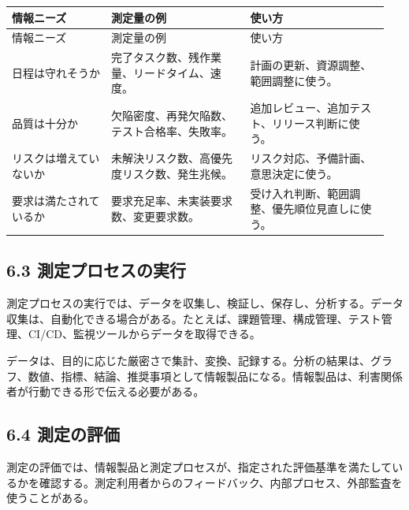 \documentclass[a4paper,11pt]{ltjsarticle}
\begin{document}
\begin{longtable}{>{\raggedright\arraybackslash}p{0.25\linewidth}>{\raggedright\arraybackslash}p{0.35\linewidth}>{\raggedright\arraybackslash}p{0.35\linewidth}}
\toprule
情報ニーズ & 測定量の例 & 使い方 \\
\midrule
\endfirsthead
\toprule
情報ニーズ & 測定量の例 & 使い方 \\
\midrule
\endhead
日程は守れそうか & 完了タスク数、残作業量、リードタイム、速度。 & 計画の更新、資源調整、範囲調整に使う。 \\
品質は十分か & 欠陥密度、再発欠陥数、テスト合格率、失敗率。 & 追加レビュー、追加テスト、リリース判断に使う。 \\
リスクは増えていないか & 未解決リスク数、高優先度リスク数、発生兆候。 & リスク対応、予備計画、意思決定に使う。 \\
要求は満たされているか & 要求充足率、未実装要求数、変更要求数。 & 受け入れ判断、範囲調整、優先順位見直しに使う。 \\
\bottomrule
\end{longtable}

\subsection{6.3 測定プロセスの実行}
測定プロセスの実行では、データを収集し、検証し、保存し、分析する。データ収集は、自動化できる場合がある。たとえば、課題管理、構成管理、テスト管理、CI/CD、監視ツールからデータを取得できる。

データは、目的に応じた厳密さで集計、変換、記録する。分析の結果は、グラフ、数値、指標、結論、推奨事項として情報製品になる。情報製品は、利害関係者が行動できる形で伝える必要がある。

\begin{center}
\end{center}

\subsection{6.4 測定の評価}
測定の評価では、情報製品と測定プロセスが、指定された評価基準を満たしているかを確認する。測定利用者からのフィードバック、内部プロセス、外部監査を使うことがある。
\end{document}
